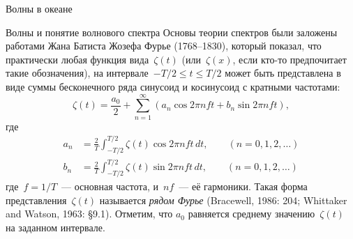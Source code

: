 \begin{chapter}{Волны в океане}
\begin{section}{Волны и понятие волнового спектра}
Основы теории спектров были заложены работами Жана Батиста Жозефа Фурье
(1768--1830), который показал, что практически любая функция вида~$\zeta(t)$ 
(или~$\zeta (x)$, если кто-то предпочитает такие обозначения), 
на интервале~$-T/2 \le t \le T/2$ может быть представлена в виде суммы
бесконечного ряда синусоид и косинусоид с кратными частотами:
\begin{equation}\label{eq:16.16}
  \zeta (t) = \frac{a_0}{2} + \sum_{n=1}^{\infty} (a_n \cos 2\pi nft + b_n \sin 2\pi nft),
\end{equation}
где
\begin{subequations}\label{eq:16.17}
\begin{align}
 a_n &= \frac{2}{T} \int_{-T/2}^{T/2} \zeta (t) \cos 2\pi nft \, dt, 
          \qquad (n=0,1,2,\ldots) \\
 b_n &= \frac{2}{T} \int_{-T/2}^{T/2} \zeta (t) \sin 2\pi nft \, dt, 
          \qquad (n=0,1,2,\ldots)
\end{align}
\end{subequations}
где~$f = 1/ T$~--- основная частота, и~$nf$~--- её гармоники. 
Такая форма представления~$\zeta (t)$ называется
\emph{рядом Фурье} 
(Bracewell, 1986: 204; Whittaker and Watson, 1963: \S 9.1). 
Отметим, что $a_0$ равняется среднему значению~$\zeta (t)$ на заданном 
интервале.
%


\end{section}
\end{chapter}
